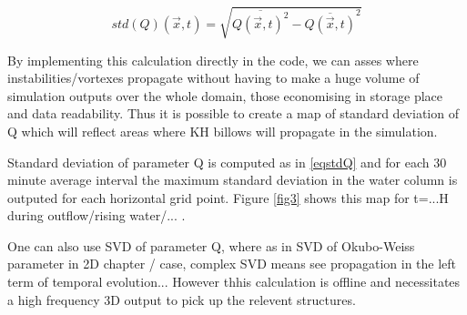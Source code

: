 \begin{equation} 
\label{eqstdQ} 
    std ( Q ) (\vec{x},t)=  \sqrt{   \overline{Q (\vec{x},t)^{2}} -  \overline{Q(\vec{x},t)}^{2}       }
\end{equation}

By implementing this calculation directly in the code, we can asses where instabilities/vortexes propagate without having to make a huge volume of simulation outputs over the whole domain, those economising in storage place and data readability. Thus it is possible to create a map of standard deviation of Q which will reflect areas where KH billows will propagate in the simulation.





Standard deviation of parameter Q is computed as in \ref{eqstdQ} and for each 30 minute average interval the maximum standard deviation in the water column is outputed for each horizontal grid point. Figure \ref{fig3} shows this map for t=...H during outflow/rising water/... .

One can also use SVD of parameter Q, where as in SVD of Okubo-Weiss parameter in 2D chapter / case, complex SVD means see propagation in the left  term of temporal evolution... However thhis calculation is offline and necessitates a high frequency 3D output to pick up the relevent structures.





